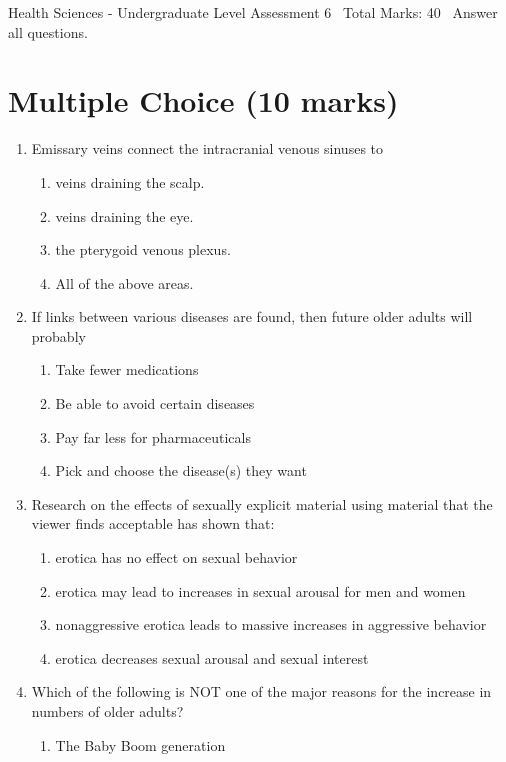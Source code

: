\documentclass[12pt]{article}
\begin{document}
\begin{center}
Health Sciences - Undergraduate Level Assessment 6 \
Total Marks: 40 \
Answer all questions.
\end{center}

\section*{Multiple Choice (10 marks)}
\begin{enumerate}[label=\arabic*.]
\item Emissary veins connect the intracranial venous sinuses to
\begin{enumerate}[label=(\alph*)]
    \item veins draining the scalp.
    \item veins draining the eye.
    \item the pterygoid venous plexus.
    \item All of the above areas.
\end{enumerate}
\item If links between various diseases are found, then future older adults will probably
\begin{enumerate}[label=(\alph*)]
    \item Take fewer medications
    \item Be able to avoid certain diseases
    \item Pay far less for pharmaceuticals
    \item Pick and choose the disease(s) they want
\end{enumerate}
\item Research on the effects of sexually explicit material using material that the viewer finds acceptable has shown that:
\begin{enumerate}[label=(\alph*)]
    \item erotica has no effect on sexual behavior
    \item erotica may lead to increases in sexual arousal for men and women
    \item nonaggressive erotica leads to massive increases in aggressive behavior
    \item erotica decreases sexual arousal and sexual interest
\end{enumerate}
\item Which of the following is NOT one of the major reasons for the increase in numbers of older adults?
\begin{enumerate}[label=(\alph*)]
    \item The Baby Boom generation

\end{enumerate}
\end{enumerate}
\end{document}
